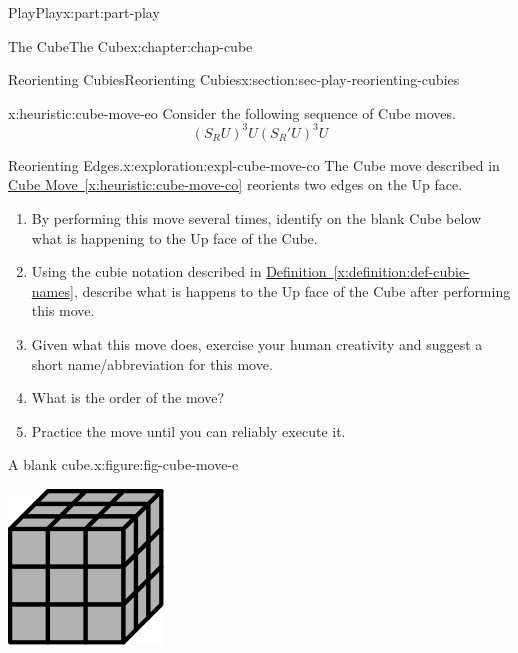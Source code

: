 \documentclass[oneside,10pt,]{book}
\newcommand{\xreffont}{\relax}
\numberwithin{equation}{section}
\begin{document}
\begin{partptx}{Play}{}{Play}{}{}{x:part:part-play}
\begin{chapterptx}{The Cube}{}{The Cube}{}{}{x:chapter:chap-cube}
\begin{sectionptx}{Reorienting Cubies}{}{Reorienting Cubies}{}{}{x:section:sec-play-reorienting-cubies}
\begin{heuristic}{}{}{x:heuristic:cube-move-eo}%
%
Consider the following sequence of Cube moves.%
%
\begin{equation*}
(S_R U)^3 U (S_R ' U)^3 U
\end{equation*}
\end{heuristic}
\begin{exploration}{Reorienting Edges.}{x:exploration:expl-cube-move-co}%
The Cube move described in \hyperref[x:heuristic:cube-move-co]{Cube Move~{\xreffont\ref{x:heuristic:cube-move-co}}} reorients two edges on the Up face.%
%
\begin{enumerate}
\item{}By performing this move several times, identify on the blank Cube below what is happening to the Up face of the Cube.%
\item{}Using the cubie notation described in \hyperref[x:definition:def-cubie-names]{Definition~{\xreffont\ref{x:definition:def-cubie-names}}}, describe what is happens to the Up face of the Cube after performing this move.%
\item{}Given what this move does, exercise your human creativity and suggest a short name\slash{}abbreviation for this move.%
\item{}What is the order of the move?%
\item{}Practice the move until you can reliably execute it.%
\end{enumerate}
\begin{figureptx}{A blank cube.}{x:figure:fig-cube-move-e}{}%
\begin{image}{0.25}{0.5}{0.25}%
\includegraphics[width=\linewidth]{./images/grey_cube.svg}

\end{image}
\end{figureptx}
\end{exploration}
\end{sectionptx}
\end{chapterptx}
\end{partptx}
\end{document}
